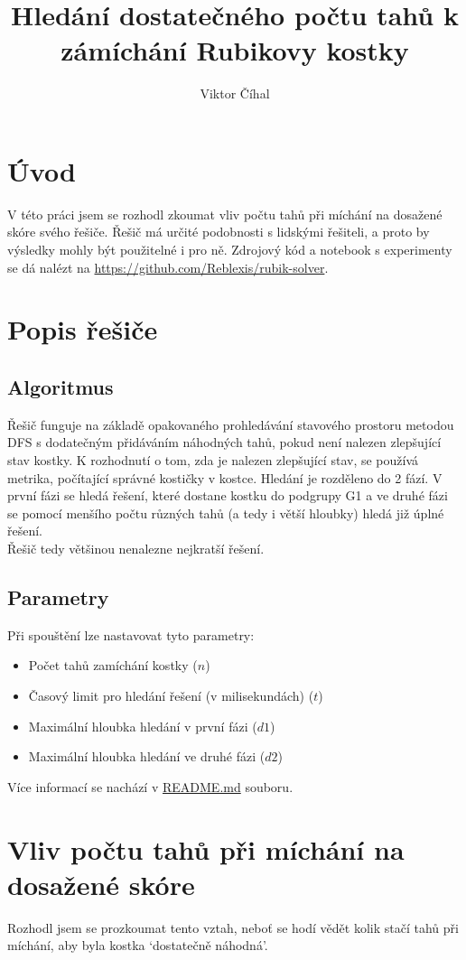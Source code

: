 \documentclass{article}
\title{Hledání dostatečného počtu tahů k zámíchání Rubikovy kostky}
\author{Viktor Číhal}
\date{}
\begin{document}
\maketitle
\section*{Úvod}
V této práci jsem se rozhodl zkoumat vliv počtu tahů při míchání na dosažené skóre svého řešiče.
Řešič má určité podobnosti s lidskými řešiteli, a proto by výsledky mohly být použitelné i pro ně.
Zdrojový kód a notebook s experimenty se dá nalézt na \url{https://github.com/Reblexis/rubik-solver}.

\section*{Popis řešiče}
\subsection*{Algoritmus}
Řešič funguje na základě opakovaného prohledávání stavového prostoru metodou DFS
s dodatečným přidáváním náhodných tahů, pokud není nalezen zlepšující stav kostky.
K rozhodnutí o tom, zda je nalezen zlepšující stav, se používá metrika, počítající
správné kostičky v kostce. Hledání je rozděleno do 2 fází. V první fázi se hledá
řešení, které dostane kostku do podgrupy G1 a ve druhé fázi se pomocí menšího počtu
různých tahů (a tedy i větší hloubky) hledá již úplné řešení.\\
Řešič tedy většinou nenalezne nejkratší řešení.

\subsection*{Parametry}
Při spouštění lze nastavovat tyto parametry:
\begin{itemize}
    \item Počet tahů zamíchání kostky ($n$)
    \item Časový limit pro hledání řešení (v milisekundách) ($t$)
    \item Maximální hloubka hledání v první fázi ($d1$)
    \item Maximální hloubka hledání ve druhé fázi ($d2$)
\end{itemize}

Více informací se nachází v \href{https://github.com/Reblexis/rubik-solver/blob/main/README.md}{README.md} souboru.

\section*{Vliv počtu tahů při míchání na dosažené skóre}
Rozhodl jsem se prozkoumat tento vztah, neboť se hodí vědět kolik stačí tahů při míchání, aby byla kostka
`dostatečně náhodná'. \\
\end{document}
